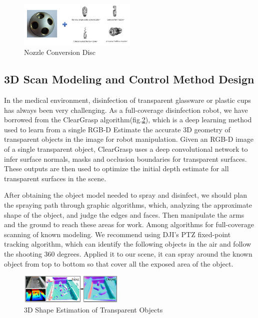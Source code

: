 \begin{figure}[htbp] 
\centering 
\includegraphics[width=0.5\textwidth]{figures/translator.PNG} 
\caption{Nozzle Conversion Disc} 
\label{Nozzle Conversion Disc} 
\end{figure}

\subsection{3D Scan Modeling and Control Method Design}
In the medical environment, disinfection of transparent glassware or plastic cups has always been very challenging. As a full-coverage disinfection robot, we have borrowed from the ClearGrasp algorithm(fig.\ref{3dshape})\cite{sajjan2020clear}, which is a deep learning method used to learn from a single RGB-D Estimate the accurate 3D geometry of transparent objects in the image for robot manipulation. Given an RGB-D image of a single transparent object, ClearGrasp uses a deep convolutional network to infer surface normals, masks and occlusion boundaries for transparent surfaces. These outputs are then used to optimize the initial depth estimate for all transparent surfaces in the scene. 
\par After obtaining the object model needed to spray and disinfect, we should plan the spraying path through graphic algorithms, which, analyzing the approximate shape of the object, and judge the edges and faces. Then manipulate the arms and the ground to reach these areas for work. Among algorithms for full-coverage scanning of known modeling. We recommend using DJI's PTZ fixed-point tracking algorithm\cite{dji}, which can identify the following objects in the air and follow the shooting 360 degrees. Applied it to our scene, it can spray around the known object from top to bottom so that cover all the exposed area of the object.
\begin{figure}[htbp] 
\centering 
\includegraphics[width=0.45\textwidth]{figures/2020clear.png} 
\caption{3D Shape Estimation of Transparent Objects} 
\label{3dshape} 
\end{figure}